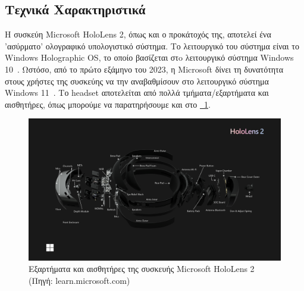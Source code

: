 \subsection{Τεχνικά Χαρακτηριστικά}\label{subsec:hololensSpecs}
Η συσκεύη Microsoft HoloLens 2, όπως και ο προκάτοχός της, αποτελεί ένα 'ασύρματο' ολογραφικό υπολογιστικό σύστημα. Το λειτουργικό του σύστημα είναι το Windows Holographic OS, το οποίο βασίζεται στo λειτουργικό σύστημα Windows 10~\cite{scooley_2023_hololens}. Ωστόσο, από το πρώτο εξάμηνο του 2023, η Microsoft δίνει τη δυνατότητα στους χρήστες της συσκεύης να την αναβαθμίσουν στο λειτουργικό σύστημα Windows 11~\cite{seiler_2023_microsoft}. Το headset αποτελείται από πολλά τμήματα/εξαρτήματα και αισθητήρες, όπως μπορούμε να παρατηρήσουμε και στο \hyperref[fig:hololensDeviceParts]{\schema~\ref*{fig:hololensDeviceParts}}.
\begin{figure}[!ht]
    \centering
    \includegraphics[width=130mm]{images/microsoft_hololens_2_parts2.png}
    \caption{Εξαρτήματα και αισθητήρες της συσκευής Microsoft HoloLens 2 {\footnotesize (Πηγή: learn.microsoft.com)}}\label{fig:hololensDeviceParts}
\end{figure}


